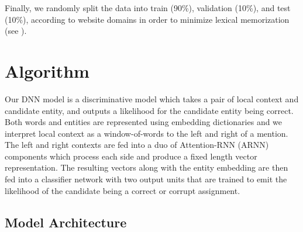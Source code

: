 \documentclass[11pt]{article}
\begin{document}
	Finally, we randomly split the data into train (90\%), validation (10\%), and test (10\%), according to website domains in order to minimize lexical memorization (see \cite{levy2015supervised}).
	
	
	\section{Algorithm}
	
	Our DNN model is a discriminative model which takes a pair of local context and candidate entity, and outputs a likelihood for the candidate entity being correct. Both words and entities are represented using embedding dictionaries and we interpret local context as a window-of-words to the left and right of a mention. The left and right contexts are fed into a duo of Attention-RNN (ARNN) components which process each side and produce a fixed length vector representation. The resulting vectors along with the entity embedding are then fed into a classifier network with two output units that are trained to emit the likelihood of the candidate being a correct or corrupt assignment. 
	
	\subsection{Model Architecture}
	
\end{document}
